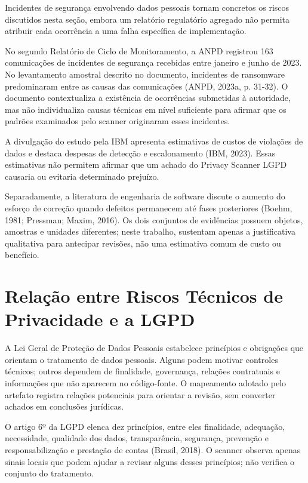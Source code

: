 \documentclass[12pt,a4paper,oneside]{report}
\begin{document}
Incidentes de segurança envolvendo dados pessoais tornam concretos os riscos discutidos nesta seção, embora um relatório regulatório agregado não permita atribuir cada ocorrência a uma falha específica de implementação.

No segundo Relatório de Ciclo de Monitoramento, a ANPD registrou 163 comunicações de incidentes de segurança recebidas entre janeiro e junho de 2023. No levantamento amostral descrito no documento, incidentes de ransomware predominaram entre as causas das comunicações (ANPD, 2023a, p. 31-32). O documento contextualiza a existência de ocorrências submetidas à autoridade, mas não individualiza causas técnicas em nível suficiente para afirmar que os padrões examinados pelo scanner originaram esses incidentes.

A divulgação do estudo pela IBM apresenta estimativas de custos de violações de dados e destaca despesas de detecção e escalonamento (IBM, 2023). Essas estimativas não permitem afirmar que um achado do Privacy Scanner LGPD causaria ou evitaria determinado prejuízo.

Separadamente, a literatura de engenharia de software discute o aumento do esforço de correção quando defeitos permanecem até fases posteriores (Boehm, 1981; Pressman; Maxim, 2016). Os dois conjuntos de evidências possuem objetos, amostras e unidades diferentes; neste trabalho, sustentam apenas a justificativa qualitativa para antecipar revisões, não uma estimativa comum de custo ou benefício.

\section{Relação entre Riscos Técnicos de Privacidade e a LGPD}

A Lei Geral de Proteção de Dados Pessoais estabelece princípios e obrigações que orientam o tratamento de dados pessoais. Alguns podem motivar controles técnicos; outros dependem de finalidade, governança, relações contratuais e informações que não aparecem no código-fonte. O mapeamento adotado pelo artefato registra relações potenciais para orientar a revisão, sem converter achados em conclusões jurídicas.

O artigo 6º da LGPD elenca dez princípios, entre eles finalidade, adequação, necessidade, qualidade dos dados, transparência, segurança, prevenção e responsabilização e prestação de contas (Brasil, 2018). O scanner observa apenas sinais locais que podem ajudar a revisar alguns desses princípios; não verifica o conjunto do tratamento.
\end{document}
